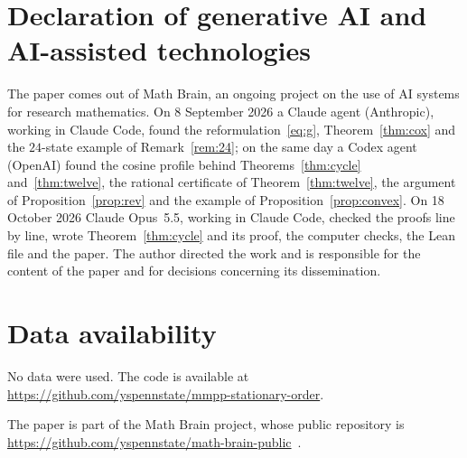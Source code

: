 \documentclass[11pt]{amsart}
\theoremstyle{remark}
\begin{document}
\section*{Declaration of generative AI and AI-assisted technologies}
The paper comes out of Math Brain, an ongoing project on the use of AI systems for research mathematics. On 8 September 2026 a Claude agent (Anthropic), working in Claude Code, found the reformulation~\eqref{eq:g}, Theorem~\ref{thm:cox} and the $24$-state example of Remark~\ref{rem:24}; on the same day a Codex agent (OpenAI) found the cosine profile behind Theorems~\ref{thm:cycle} and~\ref{thm:twelve}, the rational certificate of Theorem~\ref{thm:twelve}, the argument of Proposition~\ref{prop:rev} and the example of Proposition~\ref{prop:convex}. On 18 October 2026 Claude Opus~5.5, working in Claude Code, checked the proofs line by line, wrote Theorem~\ref{thm:cycle} and its proof, the computer checks, the Lean file and the paper. The author directed the work and is responsible for the content of the paper and for decisions concerning its dissemination.

\section*{Data availability}
No data were used. The code is available at\\ \url{https://github.com/yspennstate/mmpp-stationary-order}.

The paper is part of the Math Brain project, whose public repository is \url{https://github.com/yspennstate/math-brain-public}~\cite{MathBrainRepo}.
\end{document}
